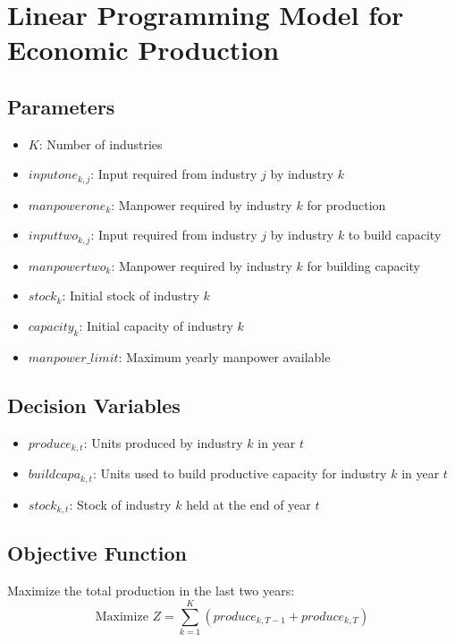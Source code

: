 \documentclass{article}
\begin{document}
\section*{Linear Programming Model for Economic Production}

\subsection*{Parameters}
\begin{itemize}
    \item $K$: Number of industries
    \item $inputone_{k, j}$: Input required from industry $j$ by industry $k$
    \item $manpowerone_{k}$: Manpower required by industry $k$ for production
    \item $inputtwo_{k, j}$: Input required from industry $j$ by industry $k$ to build capacity
    \item $manpowertwo_{k}$: Manpower required by industry $k$ for building capacity
    \item $stock_k$: Initial stock of industry $k$
    \item $capacity_k$: Initial capacity of industry $k$
    \item $manpower\_limit$: Maximum yearly manpower available
\end{itemize}

\subsection*{Decision Variables}
\begin{itemize}
    \item $produce_{k, t}$: Units produced by industry $k$ in year $t$
    \item $buildcapa_{k, t}$: Units used to build productive capacity for industry $k$ in year $t$
    \item $stock_{k, t}$: Stock of industry $k$ held at the end of year $t$
\end{itemize}

\subsection*{Objective Function}
Maximize the total production in the last two years:
\[
\text{Maximize } Z = \sum_{k=1}^{K} (produce_{k, T-1} + produce_{k, T})
\]
\end{document}
